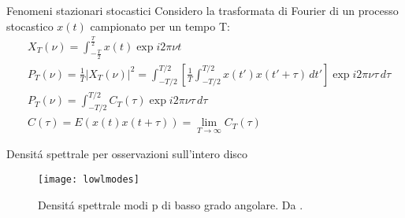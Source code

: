 \begin{frame}{Fenomeni stazionari stocastici}
Considero la trasformata di Fourier di un processo stocastico $x(t)$ campionato per un tempo T:
\begin{align}
&X_T(\nu)=\int_{-\frac{T}{2}}^{\frac{T}{2}}x(t)\exp{i2\pi\nu t}\\
&P_T(\nu)=\frac{1}{T}|X_T(\nu)|^2\label{eq:powerspectraldensity}
=\int_{-T/2}^{T/2}\left[\frac{1}{T}\int_{-T/2}^{T/2}x(t')x(t'+\tau)\,dt'\right]\exp{i2\pi\nu \tau}\,d\tau\\
&P_T(\nu)=\int_{-T/2}^{T/2}C_T(\tau)\exp{i2\pi\nu\tau}\,d\tau\\
&C(\tau)=E(x(t)x(t+\tau))=\lim_{T\to\infty}{C_T(\tau)}
\end{align}

\end{frame}

\begin{frame}{Densit\'a spettrale per osservazioni sull'intero disco}

\begin{figure}[!ht]
\centering
\texttt{[image: lowlmodes]}
\caption{Densit\'a spettrale modi p di basso grado angolare. Da \cite{chr02helioseismology}.}\label{fig:lowlmodes}
\end{figure}

\end{frame}

